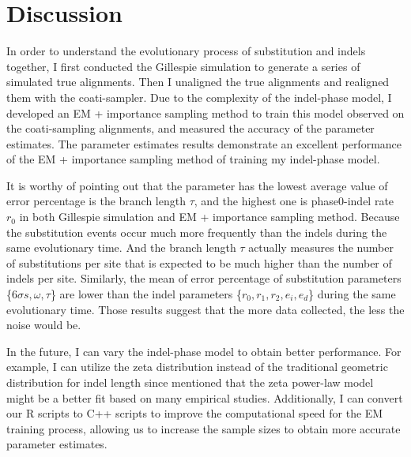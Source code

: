 \section{Discussion}
In order to understand the evolutionary process of substitution and indels together, I first conducted the Gillespie simulation to generate a series of simulated true alignments. Then I unaligned the true alignments and realigned them with the coati-sampler. Due to the complexity of the indel-phase model, I developed an EM + importance sampling method to train this model observed on the coati-sampling alignments, and measured the accuracy of the parameter estimates. The parameter estimates results demonstrate an excellent performance of the EM + importance sampling method of training my indel-phase model.    

It is worthy of pointing out that the parameter has the lowest average value of error percentage is the branch length $\tau$, and the highest one is phase0-indel rate $r_0$  in both Gillespie simulation and EM + importance sampling method. Because the substitution events occur much more frequently than the indels during the same evolutionary time. And the branch length $\tau$ actually measures the number of substitutions per site that is expected to be much higher than the number of indels per site. Similarly, the mean of error percentage of substitution parameters \{$6\sigma s, \omega, \tau $\} are lower than the indel parameters \{$r_0, r_1, r_2,  e_i, e_d $\} during the same evolutionary time. Those results suggest that the more data collected, the less the noise would be. 

In the future, I can vary the indel-phase model to obtain better performance. For example, I can utilize the zeta distribution instead of the traditional geometric distribution for indel length since \cite{cartwright2009problems} mentioned that the zeta power-law model might be a better fit based on many empirical studies. Additionally, I can convert our R scripts to C++ scripts to improve the computational speed for the EM training process, allowing us to increase the sample sizes to obtain more accurate parameter estimates.   







%
%


